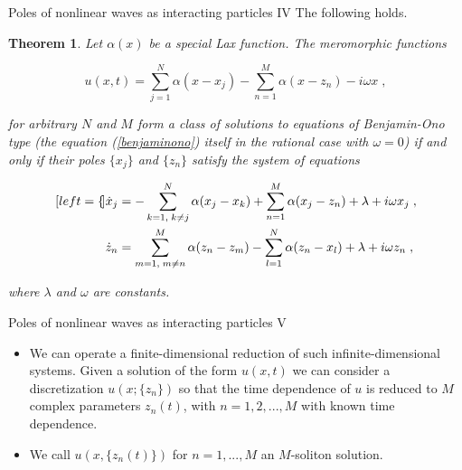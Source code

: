 \documentclass[aspectratio=169, 9pt]{beamer}
\newtheorem{thm}{Theorem}
\begin{document}
\begin{frame}{Poles of nonlinear waves as interacting particles IV}
The following holds.

\begin{thm}
Let $\alpha(x)$ be a special Lax function. The meromorphic functions 

\begin{equation}\label{solitonequation}
    u(x,t) = \sum_{j=1}^N \alpha (x - x_j) - \sum_{n=1}^M \alpha (x - z_n) - i\omega x\;,
\end{equation}

for arbitrary $N$ and $M$ form a class of solutions to equations of Benjamin-Ono type (the equation (\ref{benjaminono}) itself in the rational case with $\omega = 0$) if and only if their poles $\{x_j\}$ and $\{z_n\}$ satisfy the system of equations

\begin{subequations}
\begin{align}[left=\empheqlbrace]
\dot x_j &= - \sum_{k=1,\;k \neq j}^N \alpha(x_j - x_k) + \sum_{n = 1}^M \alpha(x_j - z_n) + \lambda + i\omega x_j\;,\\
\dot z_n &= \sum_{m=1,\;m \neq n}^M \alpha(z_n - z_m) - \sum_{l = 1}^N \alpha(z_n - x_l) + \lambda + i\omega z_n\;,
\end{align}
\end{subequations}

where $\lambda$ and $\omega$ are constants. 
\end{thm}
\end{frame}

\begin{frame}{Poles of nonlinear waves as interacting particles V}

\begin{itemize}
\item We can operate a finite-dimensional reduction of such infinite-dimensional systems. Given a solution of the form $u(x,t)$ we can consider a discretization $u(x; \{z_n\})$ so that the time dependence of $u$ is reduced to $M$ complex parameters $z_n (t)$, with $n = 1, 2,..., M$ with known time dependence. 

\vspace{\baselineskip}

\item We call $u(x, \{z_n(t)\})$ for $n = 1, ..., M$ an $M$-soliton solution.
\end{itemize}
\end{frame}
\end{document}
